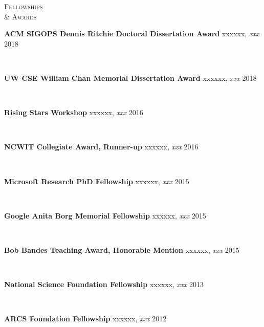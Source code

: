 \documentclass[10pt,times]{report}
\newlength{\sectiongap}
\newlength{\entrygap}
\newlength{\sectioncolwidth}
\newlength{\colgap}
\newlength{\stuffwidth}
\def\ifEqString#1#2{\def\testa{#1}\def\testb{#2}%
  \ifx\testa\testb}
\newenvironment{rtable}{
  \begin{minipage}{\textwidth}
  }{
  \end{minipage}
}
\newenvironment{rentry}[3][xxx]{
  \begin{minipage}[t]{\hsize}
    \textbf{#2}\ifEqString{#1}{xxx}\relax\else, \textit{#1}\fi
    \hspace{\stretch{1}} #3 \\
  }{
    \removelastskip
  \end{minipage}
  \\[\entrygap]  %
}
\newenvironment{rsection}[1]{
  \begin{minipage}[t]{\sectioncolwidth}
    \textsc{#1}
  \end{minipage}
  \hspace{\colgap}
  \begin{minipage}[t]{\stuffwidth}
  }{
    \removelastskip
  \end{minipage}
  \\[\sectiongap]
}
\begin{document}
\begin{rtable}
  \begin{rsection}{Fellowships\\\& Awards}
    \begin{rentry}{ACM SIGOPS Dennis Ritchie Doctoral Dissertation Award}{2018}
      \vspace{-0.5em}
    \end{rentry} 
    \begin{rentry}{UW CSE William Chan Memorial Dissertation Award}{2018}
      \vspace{-0.5em}
    \end{rentry} 
    \begin{rentry}{Rising Stars Workshop}{2016}
      \vspace{-0.5em}
    \end{rentry} 
    \begin{rentry}{NCWIT Collegiate Award, Runner-up}{2016}
     \vspace{-0.5em}
    \end{rentry} 
    \begin{rentry}{Microsoft Research PhD Fellowship}{2015}
      \vspace{-0.5em}
    \end{rentry} 
    \begin{rentry}{Google Anita Borg Memorial Fellowship}{2015}
      \vspace{-0.5em}
    \end{rentry}
    \begin{rentry}{Bob Bandes Teaching Award, Honorable Mention}{2015}
      \vspace{-0.5em}
    \end{rentry} 
    \begin{rentry}{National Science Foundation Fellowship}{2013}
      \vspace{-0.5em}
    \end{rentry}
    \begin{rentry}{ARCS Foundation Fellowship}{2012}
       \vspace{-0.5em}
    \end{rentry}

\end{rsection}
\end{rtable}
\end{document}

